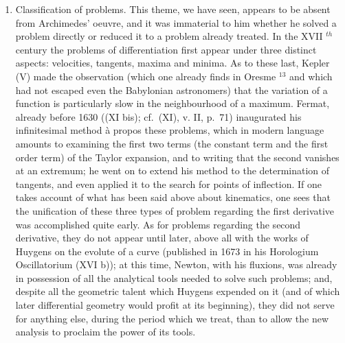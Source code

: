 \begin{enumerate}
\def\labelenumi{\Alph{enumi})}
\setcounter{enumi}{3}
\tightlist
\item
  Classification of problems. This theme, we have seen, appears to be absent from Archimedes' oeuvre, and it was immaterial to him whether he solved a problem directly or reduced it to a problem already treated. In the XVII \(^{th}\) century the problems of differentiation first appear under three distinct aspects: velocities, tangents, maxima and minima. As to these last, Kepler (V) made the observation (which one already finds in Oresme \(^{13}\) and which had not escaped even the Babylonian astronomers) that the variation of a function is particularly slow in the neighbourhood of a maximum. Fermat, already before 1630 ((XI bis); cf.~(XI), v. II, p.~71) inaugurated his infinitesimal method à propos these problems, which in modern language amounts to examining the first two terms (the constant term and the first order term) of the Taylor expansion, and to writing that the second vanishes at an extremum; he went on to extend his method to the determination of tangents, and even applied it to the search for points of inflection. If one takes account of what has been said above about kinematics, one sees that the unification of these three types of problem regarding the first derivative was accomplished quite early. As for problems regarding the second derivative, they do not appear until later, above all with the works of Huygens on the evolute of a curve (published in 1673 in his Horologium Oscillatorium (XVI b)); at this time, Newton, with his fluxions, was already in possession of all the analytical tools needed to solve such problems; and, despite all the geometric talent which Huygens expended on it (and of which later differential geometry would profit at its beginning), they did not serve for anything else, during the period which we treat, than to allow the new analysis to proclaim the power of its tools.
\end{enumerate}

